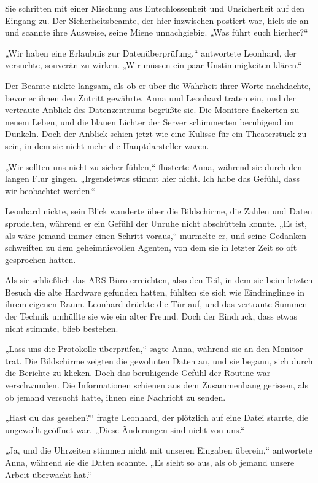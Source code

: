 \documentclass[
]{article}
\begin{document}
Sie schritten mit einer Mischung aus Entschlossenheit und Unsicherheit
auf den Eingang zu. Der Sicherheitsbeamte, der hier inzwischen postiert
war, hielt sie an und scannte ihre Ausweise, seine Miene unnachgiebig.
„Was führt euch hierher?{\kern0pt}``

„Wir haben eine Erlaubnis zur Datenüberprüfung,`` antwortete Leonhard,
der versuchte, souverän zu wirken. „Wir müssen ein paar Unstimmigkeiten
klären.``

Der Beamte nickte langsam, als ob er über die Wahrheit ihrer Worte
nachdachte, bevor er ihnen den Zutritt gewährte. Anna und Leonhard
traten ein, und der vertraute Anblick des Datenzentrums begrüßte sie.
Die Monitore flackerten zu neuem Leben, und die blauen Lichter der
Server schimmerten beruhigend im Dunkeln. Doch der Anblick schien jetzt
wie eine Kulisse für ein Theaterstück zu sein, in dem sie nicht mehr die
Hauptdarsteller waren.

„Wir sollten uns nicht zu sicher fühlen,`` flüsterte Anna, während sie
durch den langen Flur gingen. „Irgendetwas stimmt hier nicht. Ich habe
das Gefühl, dass wir beobachtet werden.``

Leonhard nickte, sein Blick wanderte über die Bildschirme, die Zahlen
und Daten sprudelten, während er ein Gefühl der Unruhe nicht abschütteln
konnte. „Es ist, als wäre jemand immer einen Schritt voraus,`` murmelte
er, und seine Gedanken schweiften zu dem geheimnisvollen Agenten, von
dem sie in letzter Zeit so oft gesprochen hatten.

Als sie schließlich das ARS-Büro erreichten, also den Teil, in dem sie
beim letzten Besuch die alte Hardware gefunden hatten, fühlten sie sich
wie Eindringlinge in ihrem eigenen Raum. Leonhard drückte die Tür auf,
und das vertraute Summen der Technik umhüllte sie wie ein alter Freund.
Doch der Eindruck, dass etwas nicht stimmte, blieb bestehen.

„Lass uns die Protokolle überprüfen,`` sagte Anna, während sie an den
Monitor trat. Die Bildschirme zeigten die gewohnten Daten an, und sie
begann, sich durch die Berichte zu klicken. Doch das beruhigende Gefühl
der Routine war verschwunden. Die Informationen schienen aus dem
Zusammenhang gerissen, als ob jemand versucht hatte, ihnen eine
Nachricht zu senden.

„Hast du das gesehen?{\kern0pt}`` fragte Leonhard, der plötzlich auf
eine Datei starrte, die ungewollt geöffnet war. „Diese Änderungen sind
nicht von uns.``

„Ja, und die Uhrzeiten stimmen nicht mit unseren Eingaben überein,``
antwortete Anna, während sie die Daten scannte. „Es sieht so aus, als ob
jemand unsere Arbeit überwacht hat.``
\end{document}
